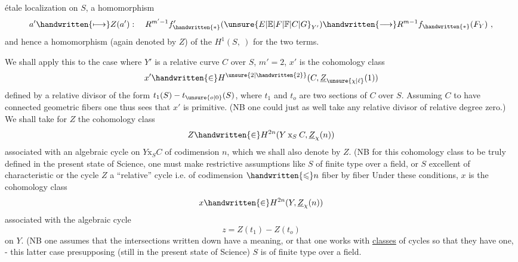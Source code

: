 étale localization on $S$, a homomorphism
\[
a'\handwritten{\longmapsto}Z(a'):\quad R^{m'-1}f'_{\handwritten{*}}({\unsure{E|\mathbb{E}|F|\mathbb{F}|C|G}}_{Y'})\handwritten{\longrightarrow}R^{m-1}f_{\handwritten{*}}(F_Y)\ ,
\]
and hence a homomorphism (again denoted by $Z$) of the $H^1(S,\ )$ for the two terms.

We shall apply this to the case where $Y'$ is a relative curve $C$ over $S$, $m'=2$, $x'$ is the cohomology class
\[
x'\handwritten{\in}H^{\unsure{2|\handwritten{2}}}(C,\underline{Z}_{\unsure{\chi|\ell}}(1))
\]
defined by a relative divisor of the form $t_1(S)-t_{\unsure{o|0}}(S)$, where $t_1$ and $t_o$ are two sections of $C$ over $S$. Assuming $C$ to have connected geometric fibers one thus sees that $x'$ is primitive. (NB one could just as well take any relative divisor of relative degree zero.) We shall take for $Z$ the cohomology class
\[
Z\handwritten{\in}H^{2n}(Y\mathbin{\mathrm{x}}_S C,\underline{Z}_{\chi}(n))
\]
associated with an algebraic cycle on $Y\mathbin{\mathrm{x}}_S C$ of codimension $n$, which we shall also denote by $Z$. (NB for this cohomology class to be truly defined in the present state of Science, one must make restrictive assumptions like $S$ of finite type over a field, or $S$ excellent of characteristic  or the cycle $Z$ a ``relative'' cycle i.e. of codimension $\handwritten{\leqslant}n$ fiber by fiber
Under these conditions, $x$ is the cohomology class
\[
x\handwritten{\in}H^{2n}(Y,\underline{Z}_{\chi}(n))
\]
associated with the algebraic cycle
\[
z=Z(t_1)-Z(t_o)
\]
on $Y$. (NB one assumes that the intersections written down have a meaning, or that one works with \uline{classes} of cycles so that they have one, - this latter case presupposing (still in the present state of Science)  $S$ is of finite type over a field.

